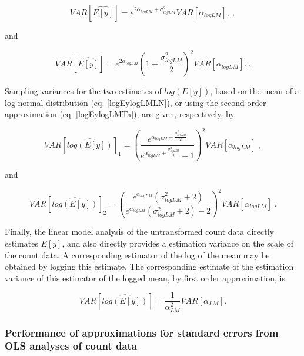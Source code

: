 \documentclass[]{article}
\begin{document}
\begin{equation}\label{SE_EylogLMLN}
VAR[\widehat{E[y]}] = e^{2\alpha_{logLM}+\sigma^2_{logLM}}VAR[\alpha_{logLM}],~,
\end{equation}

and

\begin{equation}\label{SE_EylogLMTa}
VAR[\widehat{E[y]}] =  e^{2\alpha_{logLM}}\left(1+\frac{\sigma^2_{logLM}}{2}\right)^2VAR[\alpha_{logLM}]. ~.
\end{equation}

Sampling variances for the two estimates of \(log(E[y])\), based on the
mean of a log-normal distribution (eq. \ref{logEylogLMLN}), or using the
second-order approximation (eq. \ref{logEylogLMTa}), are given,
respectively, by

\begin{equation}\label{SE_logEylogLMLN}
VAR[\widehat{log(E[y])}]_1 =\left(\frac{e^{\alpha_{logLM}+\frac{\sigma^2_{logLM}}{2}}}{e^{\alpha_{logLM}+\frac{\sigma^2_{logLM}}{2}}-1}\right)^2VAR[\alpha_{logLM}] ~,
\end{equation}

and

\begin{equation}\label{SE_logEylogLMTa}
VAR[\widehat{log(E[y])}]_2 =  \left(\frac{e^{\alpha_{logLM}}(\sigma^2_{logLM}+2)}{e^{\alpha_{logLM}}(\sigma^2_{logLM}+2)-2}\right)^2VAR[\alpha_{logLM}]   ~.
\end{equation}

Finally, the linear model analysis of the untransformed count data
directly estimates \(E[y]\), and also directly provides a estimation
variance on the scale of the count data. A corresponding estimator of
the log of the mean may be obtained by logging this estimate. The
corresponding estimate of the estimation variance of this estimator of
the logged mean, by first order approximation, is

\begin{equation} \label{SE_logEylogLMNT}
VAR[\widehat{log(E[y])}] = \frac{1}{\alpha_{LM}^2}VAR[\alpha_{LM}]. 
\end{equation}

\subsubsection{Performance of approximations for standard errors from
OLS analyses of count
data}\label{performance-of-approximations-for-standard-errors-from-ols-analyses-of-count-data}
\end{document}
